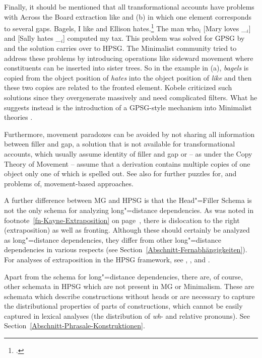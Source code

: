 Finally, it should be mentioned that all transformational accounts have problems with Across the
Board extraction like  and (b) in which one element corresponds to several gaps.
\eal
\label{ex-atb-minimalism}
\ex\label{ex-bagels-i-like-and-ellison-hates}
Bagels, I like and Ellison hates.\footnote{%
  .
}
\ex The man who$_i$ [Mary loves \_$_i$] and [Sally hates \_$_i$] computed my tax.
\zl
This problem was solved for GPSG by \citet{Gazdar81a} and the solution carries over to HPSG. The
Minimalist community tried to address these problems by introducing operations like sideward
movement \citep{Nunes2004a-u} where constituents can be inserted into sister trees. So in the
example in (a), \emph{bagels} is copied from the object position of \emph{hates} into the
object position of \emph{like} and then these two copies are related to the fronted element. Kobele
criticized such solutions since they overgenerate massively and need complicated filters. What he
suggests instead is the introduction of a GPSG-style \slasch mechanism into Minimalist theories \citep{Kobele2008a}.

Furthermore,
movement paradoxes \citep[Chapter~2]{Bresnan2001a} can be avoided by not sharing all information between filler and gap, a solution
that is not available for transformational accounts, which usually assume identity of filler and gap
or -- as under the Copy Theory of Movement -- assume that a derivation contains multiple copies of one
object only one of which is spelled out. See also  for further puzzles for, and
problems of, movement-based approaches.


A further difference between MG and HPSG is that the Head"=Filler Schema is not the only schema for analyzing
long"=distance dependencies. As was noted in footnote~\ref{fn-Kayne-Extraposition} on 
page~\pageref{fn-Kayne-Extraposition}, there is dislocation to the right (extraposition) as well
as fronting. Although these should certainly be analyzed as long"=distance dependencies, they differ from other
long"=distance dependencies in various respects (see Section~\ref{Abschnitt-Fernabhängigkeiten}). For analyses of
extraposition in the HPSG framework, see , , and 
. 

Apart from the schema for long"=distance dependencies, there are, of course, other schemata in HPSG which are not
present in MG or Minimalism. These are schemata which describe constructions without heads or are necessary to
capture the distributional properties of parts of constructions, which cannot be easily captured in lexical analyses
(\eg the distribution of \emph{wh}- and relative pronouns). See Section~\ref{Abschnitt-Phrasale-Konstruktionen}.  

